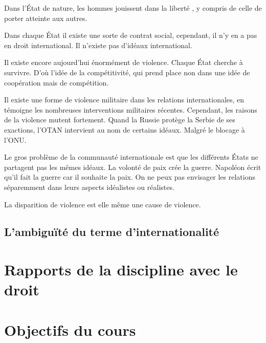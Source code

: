 ﻿\documentclass[12pt, a4paper, openany]{book}
\begin{document}
Dans l'État de nature, les hommes jouissent dans la liberté , y compris de celle de porter atteinte aux autres.

Dans chaque État il existe une sorte de contrat social, cependant, il n'y en a pas en droit international. Il n'existe pas d'idéaux international.

Il existe encore aujourd'hui énormément de violence. Chaque État cherche à survivre. D'où l'idée de la compétitivité, qui prend place non dans une idée de coopération mais de compétition.

Il existe une forme de violence militaire dans les relations internationales, en témoigne les nombreuses interventions militaires récentes. Cependant, les raisons de la violence mutent fortement. Quand la Russie protège la Serbie de ses exactions, l'OTAN intervient au nom de certains idéaux. Malgré le blocage à l'ONU.

Le gros problème de la communauté internationale est que les différents États ne partagent pas les mêmes idéaux. La volonté de paix crée la guerre. Napoléon écrit qu'il fait la guerre car il souhaite la paix. On ne peux pas envisager les relations séparemment dans leurs aspects idéalistes ou réalistes.

La disparition de violence est elle même une cause de violence.

		\subsection{L'ambiguïté du terme d'internationalité}
		
		
	\section{Rapports de la discipline avec le droit}

\section{Objectifs du cours}
\end{document}

